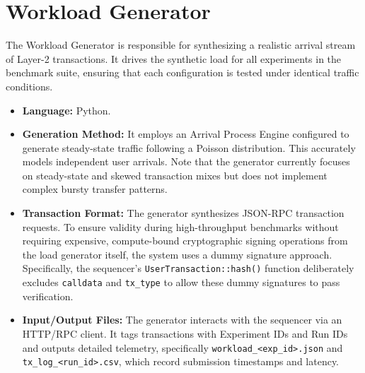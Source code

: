 \section{Workload Generator}
\label{sec:workload_generator}
The Workload Generator is responsible for synthesizing a realistic arrival stream of Layer-2 transactions. It drives the synthetic load for all experiments in the benchmark suite, ensuring that each configuration is tested under identical traffic conditions.

\begin{itemize}
    \item \textbf{Language:} Python.
    \item \textbf{Generation Method:} It employs an Arrival Process Engine configured to generate steady-state traffic following a Poisson distribution. This accurately models independent user arrivals. Note that the generator currently focuses on steady-state and skewed transaction mixes but does not implement complex bursty transfer patterns.
    \item \textbf{Transaction Format:} The generator synthesizes JSON-RPC transaction requests. To ensure validity during high-throughput benchmarks without requiring expensive, compute-bound cryptographic signing operations from the load generator itself, the system uses a dummy signature approach. Specifically, the sequencer's \texttt{UserTransaction::hash()} function deliberately excludes \texttt{calldata} and \texttt{tx\_type} to allow these dummy signatures to pass verification.
    \item \textbf{Input/Output Files:} The generator interacts with the sequencer via an HTTP/RPC client. It tags transactions with Experiment IDs and Run IDs and outputs detailed telemetry, specifically \texttt{workload\_<exp\_id>.json} and \texttt{tx\_log\_<run\_id>.csv}, which record submission timestamps and latency.
\end{itemize}